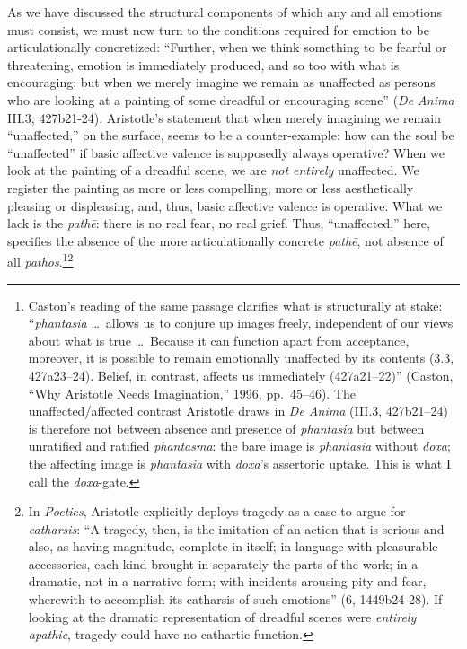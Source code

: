 \documentclass{article}
\begin{document}
As we have discussed the structural components of which any and all emotions must consist, we must now turn to the conditions required for emotion to be articulationally concretized: ``Further, when we think something to be fearful or threatening, emotion is immediately produced, and so too with what is encouraging; but when we merely imagine we remain as unaffected as persons who are looking at a painting of some dreadful or encouraging scene'' (\textit{De Anima} III.3, 427b21-24). Aristotle's statement that when merely imagining we remain ``unaffected,'' on the surface, seems to be a counter-example: how can the soul be ``unaffected'' if basic affective valence is supposedly always operative? When we look at the painting of a dreadful scene, we are \textit{not entirely} unaffected. We register the painting as more or less compelling, more or less aesthetically pleasing or displeasing, and, thus, basic affective valence is operative. What we lack is the \textit{pathē}: there is no real fear, no real grief. Thus, ``unaffected,'' here, specifies the absence of the more articulationally concrete \textit{pathē}, not absence of all \textit{pathos}.\footnote{Caston's reading of the same passage clarifies what is structurally at stake: ``\textit{phantasia} \ldots\ allows us to conjure up images freely, independent of our views about what is true \ldots\ Because it can function apart from acceptance, moreover, it is possible to remain emotionally unaffected by its contents (3.3, 427a23--24). Belief, in contrast, affects us immediately (427a21--22)'' (Caston, ``Why Aristotle Needs Imagination,'' 1996, pp.~45--46). The unaffected/affected contrast Aristotle draws in \textit{De Anima} (III.3, 427b21--24) is therefore not between absence and presence of \textit{phantasia} but between unratified and ratified \textit{phantasma}: the bare image is \textit{phantasia} without \textit{doxa}; the affecting image is \textit{phantasia} with \textit{doxa}'s assertoric uptake. This is what I call the \textit{doxa}-gate.}\footnote{In \textit{Poetics}, Aristotle explicitly deploys tragedy as a case to argue for \textit{catharsis}: ``A tragedy, then, is the imitation of an action that is serious and also, as having magnitude, complete in itself; in language with pleasurable accessories, each kind brought in separately the parts of the work; in a dramatic, not in a narrative form; with incidents arousing pity and fear, wherewith to accomplish its catharsis of such emotions'' (6, 1449b24-28). If looking at the dramatic representation of dreadful scenes were \textit{entirely apathic}, tragedy could have no cathartic function.} 
\end{document}
